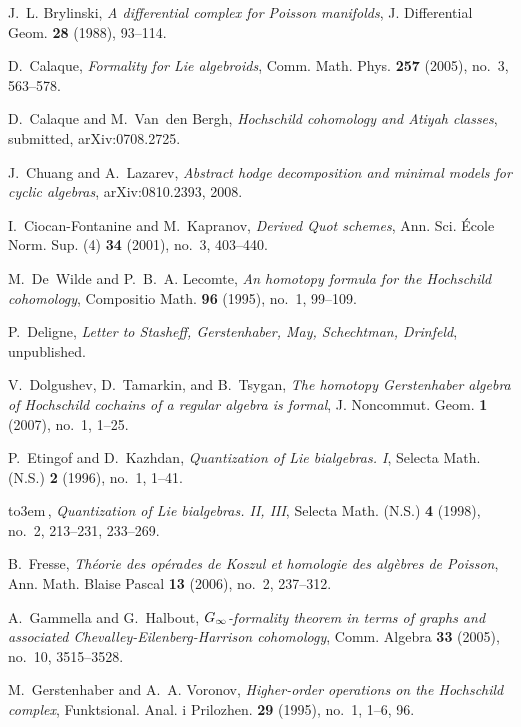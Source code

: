 \documentclass{amsart}
\numberwithin{equation}{section}
\theoremstyle{definition}
\theoremstyle{remark}
\begin{document}
  
\ifx{}

\fi
\begin{thebibliography}{10}

J.~L. Brylinski, {\em A differential complex for {P}oisson manifolds}, J.
  Differential Geom. {\bf 28} (1988), 93--114.

D.~Calaque, {\em Formality for {L}ie algebroids}, Comm. Math. Phys. {\bf 257}
  (2005), no.~3, 563--578.

D.~Calaque and M.~Van~den Bergh, {\em Hochschild cohomology and {A}tiyah
  classes}, submitted, arXiv:0708.2725.

J.~Chuang and A.~Lazarev, {\em Abstract hodge decomposition and minimal models
  for cyclic algebras}, arXiv:0810.2393, 2008.

I.~Ciocan-Fontanine and M.~Kapranov, {\em Derived {Q}uot schemes}, Ann. Sci.
  \'Ecole Norm. Sup. (4) {\bf 34} (2001), no.~3, 403--440.

M.~De~Wilde and P.~B.~A. Lecomte, {\em An homotopy formula for the {H}ochschild
  cohomology}, Compositio Math. {\bf 96} (1995), no.~1, 99--109.

P.~Deligne, {\em Letter to {S}tasheff, {G}erstenhaber, {M}ay, {S}chechtman,
  {D}rinfeld}, unpublished.

V.~Dolgushev, D.~Tamarkin, and B.~Tsygan, {\em The homotopy {G}erstenhaber
  algebra of {H}ochschild cochains of a regular algebra is formal}, J.
  Noncommut. Geom. {\bf 1} (2007), no.~1, 1--25.

P.~Etingof and D.~Kazhdan, {\em Quantization of {L}ie bialgebras. {I}}, Selecta
  Math. (N.S.) {\bf 2} (1996), no.~1, 1--41.

{\leavevmode\hbox to3em{\hrulefill}\,}, {\em Quantization of {L}ie bialgebras. {II}, {III}}, Selecta Math.
  (N.S.) {\bf 4} (1998), no.~2, 213--231, 233--269.

B.~Fresse, {\em Th\'eorie des op\'erades de {K}oszul et homologie des
  alg\`ebres de {P}oisson}, Ann. Math. Blaise Pascal {\bf 13} (2006), no.~2,
  237--312.

A.~Gammella and G.~Halbout, {\em {$G\sb \infty$}-formality theorem in terms of
  graphs and associated {C}hevalley-{E}ilenberg-{H}arrison cohomology}, Comm.
  Algebra {\bf 33} (2005), no.~10, 3515--3528.

M.~Gerstenhaber and A.~A. Voronov, {\em Higher-order operations on the
  {H}ochschild complex}, Funktsional. Anal. i Prilozhen. {\bf 29} (1995),
  no.~1, 1--6, 96.


\end{thebibliography}
\end{document}
